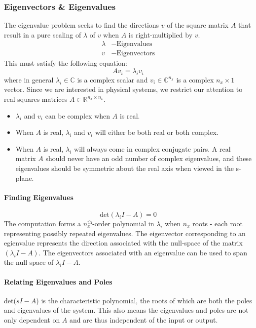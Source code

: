 \documentclass[../notes.tex]{subfiles}
\begin{document}
\subsubsection{Eigenvectors \& Eigenvalues} \label{sec:eig}
The eigenvalue problem seeks to find the directions $v$ of the square matrix $A$ that result in a pure scaling of $\lambda$ of $v$ when $A$ is right-multiplied by $v$.
\begin{align*}
    \lambda &- \text{Eigenvalues} \\
    v &- \text{Eigenvectors}  
\end{align*}
This must satisfy the following equation:
\begin{equation}
    Av_i = \lambda_i v_i
\end{equation}
where in general $\lambda_i \in \mathbb{C}$ is a complex scalar and $v_i \in \mathbb{C}^{n_x}$ is a complex $n_x \times 1$ vector. Since we are interested in physical systems, we restrict our attention to real squares matrices $A\in \mathbb{R}^{n_x \times n_x}$.
\begin{itemize}
    \item $\lambda_i$ and $v_i$ can be complex when $A$ is real.
    \item When $A$ is real, $\lambda_i$ and $v_i$ will either be both real or both complex.
    \item When $A$ is real, $\lambda_i$ will always come in complex conjugate pairs. A real matrix $A$ should never have an odd number of complex eigenvalues, and these eigenvalues should be symmetric about the real axis when viewed in the s-plane.
\end{itemize}
\paragraph{Finding Eigenvalues}
\begin{equation*}
    \text{det}(\lambda_i I - A) = 0
\end{equation*}
The computation forms a $n_x^{\text{th}}$-order polynomial in $\lambda_i$ when $n_x$ roots - each root representing possibly repeated eigenvalues. The eigenvector corresponding to an egienvalue represents the direction associated with the null-space of the matrix $(\lambda_i I -A)$. The eigenvectors associated with an eigenvalue can be used to span the null space of $\lambda_i I - A$.

\paragraph{Relating Eigenvalues and Poles}
det($s I - A$) is the characteristic polynomial, the roots of which are both the poles and eigenvalues of the system. This also means the eigenvalues and poles are not only dependent on $A$ and are thus independent of the input or output.
\end{document}
